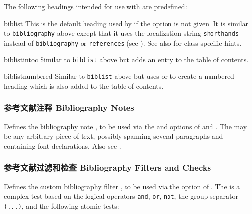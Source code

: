 The following headings intended for use with  are predefined:

\begin{valuelist*}

\item[biblist]
This is the default heading used by  if the  option is not given. It is similar to \texttt{bibliography} above except that it uses the localization string \texttt{shorthands} instead of \texttt{bibliography} or \texttt{references} (see ). See also  for class-specific hints.

\item[biblistintoc]
Similar to \texttt{biblist} above but adds an entry to the table of contents.

\item[biblistnumbered]
Similar to \texttt{biblist} above but uses  or  to create a numbered heading which is also added to the table of contents.

\end{valuelist*}

\subsubsection{参考文献注释 Bibliography Notes}
\label{use:bib:nts}

\begin{ltxsyntax}


Defines the bibliography note , to be used via the  and  options of  and . The  may be any arbitrary piece of text, possibly spanning several paragraphs and containing font declarations. Also see .

\end{ltxsyntax}

\subsubsection{参考文献过滤和检查 Bibliography Filters and Checks}
\label{use:bib:flt}

\begin{ltxsyntax}


Defines the custom bibliography filter , to be used via the  option of . The  is a complex test based on the logical operators \texttt{and}, \texttt{or}, \texttt{not}, the group separator \texttt{(...)}, and the following atomic tests:

\end{ltxsyntax}

